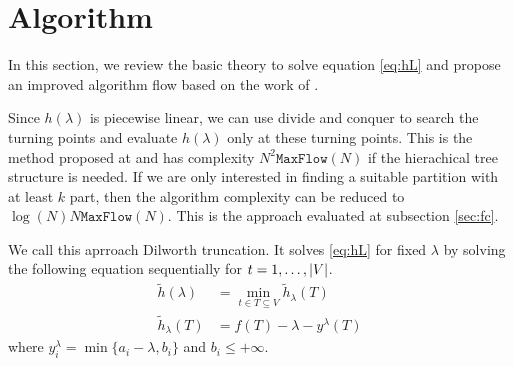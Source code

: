 \documentclass{article}
\begin{document}
\section{Algorithm}\label{sec:algorithm}

In this section, we review the basic theory to solve equation \eqref{eq:hL} and propose an improved algorithm flow based on the work of \cite{RN4}.

Since $h(\lambda)$ is piecewise linear, we can use divide and conquer to search the turning points and evaluate $h(\lambda)$ only at these turning points. This is the method proposed at \cite{RN7} and has complexity $N^2 \mathtt{MaxFlow}(N)$ if the hierachical tree structure is needed. If we are only interested in finding a suitable partition  with at least $k$ part, then the algorithm complexity can be reduced to $\log(N) N \mathtt{MaxFlow}(N)$. This is the approach evaluated at subsection \ref{sec:fc}.

We call this aprroach Dilworth truncation. It solves \eqref{eq:hL} for fixed $\lambda$ by solving the following equation sequentially for $t=1,\dots,\lvert V\rvert$.
\begin{align}\label{eq:pmq}
\tilde{h}(\lambda) & = \min_{t \in T \subseteq V} \tilde{h}_{\lambda}(T) \\
\tilde{h}_{\lambda}(T) &= f(T) - \lambda - y^{\lambda}(T)
\end{align}
where
$y^{\lambda}_i = \min\{a_i - \lambda, b_i\}$  and $b_i \leq +\infty$. 
\end{document}
